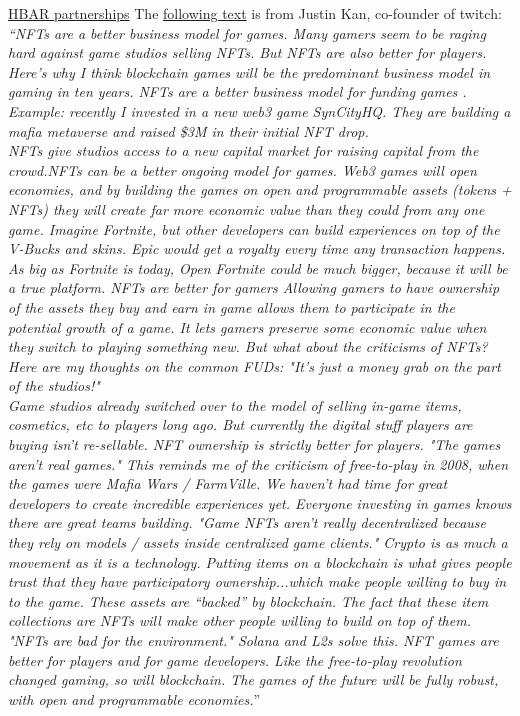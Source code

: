 \href{https://www.prnewswire.com/news-releases/hbar-foundation-and-ubisoft-partner-to-support-growth-of-gaming-on-hedera-network-301474971.html}{HBAR partnerships}
The \href{https://twitter.com/justinkan/status/1491270239967154178}{following text} is from Justin Kan, co-founder of twitch: \textit{``NFTs are a better business model for games. Many gamers seem to be raging hard against game studios selling NFTs. But NFTs are also better for players. Here’s why I think blockchain games will be the predominant business model in gaming in ten years. NFTs are a better business model for funding games . Example: recently I invested in a new web3 game SynCityHQ. They are building a mafia metaverse and raised \$3M in their initial NFT drop.\\ NFTs give studios access to a new capital market for raising capital from the crowd.NFTs can be a better ongoing model for games. Web3 games will open economies, and by building the games on open and programmable assets (tokens + NFTs) they will create far more economic value than they could from any one game. Imagine Fortnite, but other developers can build experiences on top of the V-Bucks and skins. Epic would get a royalty every time any transaction happens. As big as Fortnite is today, Open Fortnite could be much bigger, because it will be a true platform. NFTs are better for gamers Allowing gamers to have ownership of the assets they buy and earn in game allows them to participate in the potential growth of a game. It lets gamers preserve some economic value when they switch to playing something new. But what about the criticisms of NFTs?\\
Here are my thoughts on the common FUDs: "It’s just a money grab on the part of the studios!"\\
Game studios already switched over to the model of selling in-game items, cosmetics, etc to players long ago. But currently the digital stuff players are buying isn’t re-sellable. NFT ownership is strictly better for players. "The games aren’t real games." This reminds me of the criticism of free-to-play in 2008, when the games were Mafia Wars / FarmVille. We haven’t had time for great developers to create incredible experiences yet. Everyone investing in games knows there are great teams building. "Game NFTs aren’t really decentralized because they rely on models / assets inside centralized game clients."
Crypto is as much a movement as it is a technology. Putting items on a blockchain is what gives people trust that they have participatory ownership...which make people willing to buy in to the game. These assets are “backed” by blockchain.
The fact that these item collections are NFTs will make other people willing to build on top of them. "NFTs are bad for the environment." Solana and L2s solve this. NFT games are better for players and for game developers. Like the free-to-play revolution changed gaming, so will blockchain. The games of the future will be fully robust, with open and programmable economies.}''


